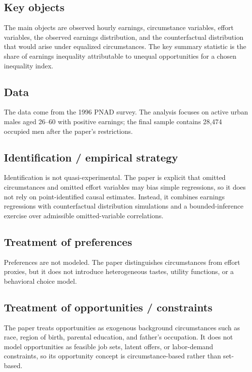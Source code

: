 \documentclass[11pt,a4paper]{article}
\begin{document}
\subsection*{Key objects}
The main objects are observed hourly earnings, circumstance variables, effort variables, the observed earnings distribution, and the counterfactual distribution that would arise under equalized circumstances. The key summary statistic is the share of earnings inequality attributable to unequal opportunities for a chosen inequality index.

\subsection*{Data}
The data come from the 1996 PNAD survey. The analysis focuses on active urban males aged 26–60 with positive earnings; the final sample contains 28,474 occupied men after the paper’s restrictions.

\subsection*{Identification / empirical strategy}
Identification is not quasi-experimental. The paper is explicit that omitted circumstances and omitted effort variables may bias simple regressions, so it does not rely on point-identified causal estimates. Instead, it combines earnings regressions with counterfactual distribution simulations and a bounded-inference exercise over admissible omitted-variable correlations.

\subsection*{Treatment of preferences}
Preferences are not modeled. The paper distinguishes circumstances from effort proxies, but it does not introduce heterogeneous tastes, utility functions, or a behavioral choice model.

\subsection*{Treatment of opportunities / constraints}
The paper treats opportunities as exogenous background circumstances such as race, region of birth, parental education, and father’s occupation. It does not model opportunities as feasible job sets, latent offers, or labor-demand constraints, so its opportunity concept is circumstance-based rather than set-based.
\end{document}
